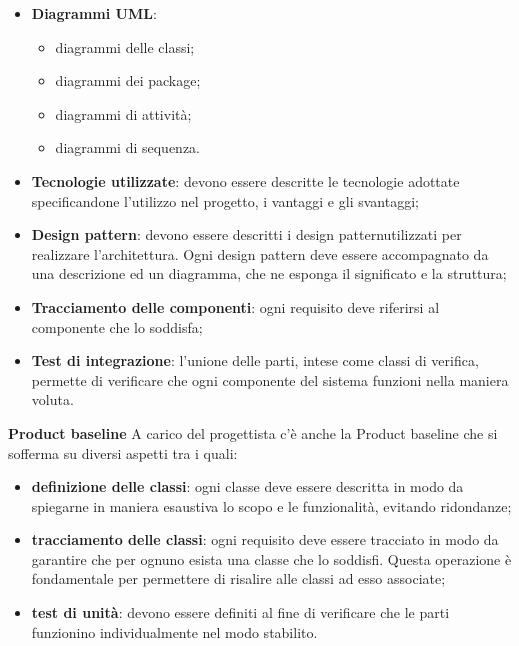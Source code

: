 			\begin{itemize}
				\item \textbf{Diagrammi UML\glo}:
				\begin{itemize}
					\item diagrammi delle classi;
					\item diagrammi dei package;
					\item diagrammi di attività;
					\item diagrammi di sequenza.
				\end{itemize}
				\item \textbf{Tecnologie utilizzate}: devono essere descritte le tecnologie adottate specificandone l'utilizzo nel progetto, i vantaggi e gli svantaggi;
				\item \textbf{Design pattern}: devono essere descritti i design pattern\glosp utilizzati per realizzare l'architettura. Ogni design pattern deve essere accompagnato da una descrizione ed un diagramma, che ne esponga il significato e la struttura;
				\item \textbf{Tracciamento delle componenti}: ogni requisito deve riferirsi al componente che lo soddisfa;
				\item \textbf{Test di integrazione}: l'unione delle parti, intese come classi di verifica, permette di verificare che ogni componente del sistema funzioni nella maniera voluta.
			\end{itemize}
			\textbf{Product baseline} \newline \newline
			A carico del progettista c'è anche la Product baseline che si sofferma su diversi aspetti tra i quali:
			\begin{itemize}
				\item \textbf{definizione delle classi}: ogni classe deve essere descritta in modo da spiegarne in maniera esaustiva lo scopo e le funzionalità, evitando ridondanze;
				\item \textbf{tracciamento delle classi}: ogni requisito deve essere tracciato in modo da garantire che per ognuno esista una classe che lo soddisfi. Questa operazione è fondamentale per permettere di risalire alle classi ad esso associate;
				\item \textbf{test di unità}: devono essere definiti al fine di verificare che le parti funzionino individualmente nel modo stabilito.
			\end{itemize}

